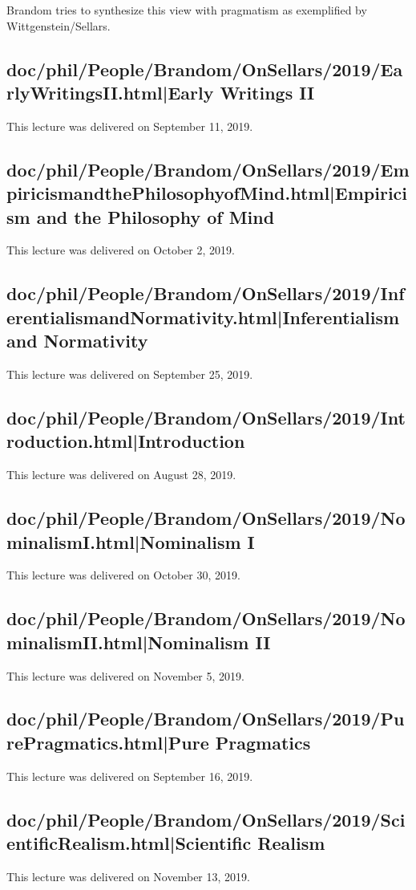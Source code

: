 \documentclass[12pt,a4paper]{report}
\begin{document}
Brandom tries to synthesize this view with pragmatism as exemplified by Wittgenstein/Sellars.
\subsection{doc/phil/People/Brandom/OnSellars/2019/EarlyWritingsII.html|Early Writings II}
This lecture was delivered on September 11, 2019.

\subsection{doc/phil/People/Brandom/OnSellars/2019/EmpiricismandthePhilosophyofMind.html|Empiricism and the Philosophy of Mind}
This lecture was delivered on October 2, 2019.

\subsection{doc/phil/People/Brandom/OnSellars/2019/InferentialismandNormativity.html|Inferentialism and Normativity}
This lecture was delivered on September 25, 2019.

\subsection{doc/phil/People/Brandom/OnSellars/2019/Introduction.html|Introduction}
This lecture was delivered on August 28, 2019.

\subsection{doc/phil/People/Brandom/OnSellars/2019/NominalismI.html|Nominalism I}
This lecture was delivered on October 30, 2019.

\subsection{doc/phil/People/Brandom/OnSellars/2019/NominalismII.html|Nominalism II}
This lecture was delivered on November 5, 2019.

\subsection{doc/phil/People/Brandom/OnSellars/2019/PurePragmatics.html|Pure Pragmatics}
This lecture was delivered on September 16, 2019.

\subsection{doc/phil/People/Brandom/OnSellars/2019/ScientificRealism.html|Scientific Realism}
This lecture was delivered on November 13, 2019.
\end{document}
